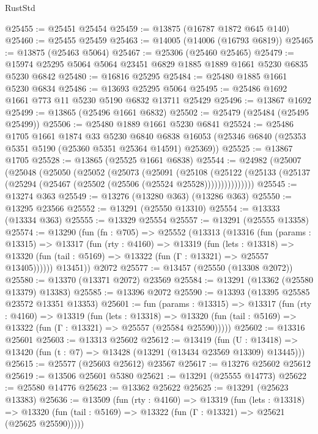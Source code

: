\begin{lexlean}{RustStd}
\begin{coremodule}
@25455 := @25451 @25454
@25459 := @13875 (@16787 @1872 @645 @140)
@25460 := @25455 @25459
@25463 := @14005 (@14006 (@16793 @6819))
@25465 := @13875 (@25463 @5064)
@25467 := @25306 (@25460 @25465)
@25479 := @15974 @25295 @5064 @5064 @23451 @6829 @1885 @1889 @1661 @5230 @6835 @5230 @6842
@25480 := @16816 @25295
@25484 := @25480 @1885 @1661 @5230 @6834
@25486 := @13693 @25295 @5064
@25495 := @25486 @1692 @1661 @773 @11 @5230 @5190 @6832 @13711 @25429
@25496 := @13867 @1692
@25499 := @13865 (@25496 @1661 @6832)
@25502 := @25479 (@25484 (@25495 @25499))
@25506 := @25480 @1889 @1661 @5230 @6841
@25524 := @25486
    @1705
    @1661
    @1874
    @33
    @5230
    @6840
    @6838
    @16053
    (@25346 @6840 (@25353 @5351 @5190 (@25360 @5351 @25364 @14591) @25369))
@25525 := @13867 @1705
@25528 := @13865 (@25525 @1661 @6838)
@25544 := @24982
    (@25007
      (@25048
        (@25050
          (@25052
            (@25073
              (@25091
                (@25108
                  (@25122
                    (@25133 (@25137 (@25294 (@25467 (@25502 (@25506 (@25524 @25528)))))))))))))))
@25545 := @13274 @363
@25549 := @13276 (@13280 @363) (@13286 @363)
@25550 := @13295 @23566
@25552 := @13291 (@25550 @13310)
@25554 := @13333 (@13334 @363)
@25555 := @13329 @25554
@25557 := @13291 (@25555 @13358)
@25574 := @13290
    (fun (fn : @705) =>
    @25552
      (@13313
        (@13316
          (fun (params : @13315) =>
          @13317
            (fun (rty : @4160) =>
            @13319
              (fun (lets : @13318) =>
              @13320 (fun (tail : @5169) => @13322 (fun (Γ : @13321) => @25557 @13405))))))
        @13451))
    @2072
@25577 := @13457 (@25550 (@13308 @2072))
@25580 := @13370 (@13371 @2072) @23569
@25584 := @13291 (@13362 (@25580 @13379) @13383)
@25585 := @13396 @2072
@25590 := @13393 (@13395 @25585 @23572 @13351 @13353)
@25601 := fun (params : @13315) =>
  @13317
    (fun (rty : @4160) =>
    @13319
      (fun (lets : @13318) =>
      @13320 (fun (tail : @5169) => @13322 (fun (Γ : @13321) => @25557 (@25584 @25590)))))
@25602 := @13316 @25601
@25603 := @13313 @25602
@25612 := @13419
    (fun (U : @13418) => @13420 (fun (t : @7) => @13428 (@13291 (@13434 @23569 @13309) @13445)))
@25615 := @25577 (@25603 @25612) @23567
@25617 := @13276 @25602 @25612
@25619 := @13506 @25601 @5380
@25621 := @13291 (@25555 @14773)
@25622 := @25580 @14776
@25623 := @13362 @25622
@25625 := @13291 (@25623 @13383)
@25636 := @13509
    (fun (rty : @4160) =>
    @13319
      (fun (lets : @13318) =>
      @13320 (fun (tail : @5169) => @13322 (fun (Γ : @13321) => @25621 (@25625 @25590)))))

\end{coremodule}
\end{lexlean}
